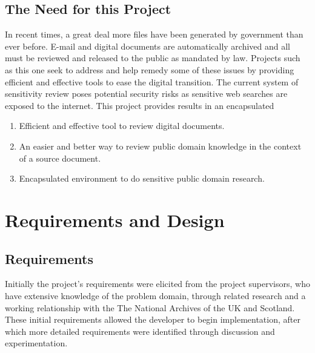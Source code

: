 \documentclass{l4proj}
\begin{document}
\section{The Need for this Project}
In recent times, a great deal more files have been generated by government than ever before. E-mail and digital documents are automatically archived and all must be reviewed and released to the public as mandated by law.  
Projects such as this one seek to address and help remedy some of these issues by providing efficient and effective tools to ease the digital transition.
The current system of sensitivity review poses potential security risks as sensitive web searches are exposed to the internet. This project provides results in an encapsulated
\begin{center}
\begin{enumerate}[label=\textbf{Need.\arabic*}]
\item Efficient and effective tool to review digital documents.
\item An easier and better way to review public domain knowledge in the context of a source document.
\item Encapsulated environment to do sensitive public domain research.
\end{enumerate}
\end{center}

\chapter{Requirements and Design} \label{requirementsanddesign}
\section{Requirements}
Initially the project's requirements were elicited from the project supervisors, who have extensive knowledge of the problem domain, through related research and a working relationship with the The National Archives of the UK and Scotland.
These initial requirements allowed the developer to begin implementation, after which more detailed requirements were identified through discussion and experimentation.
\end{document}
